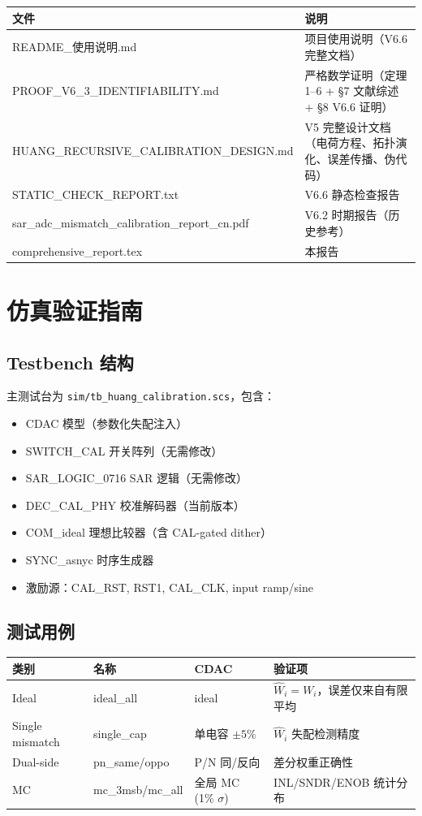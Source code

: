 \documentclass[UTF8,a4paper,12pt]{ctexart}
\theoremstyle{definition}
\begin{document}
\begin{longtable}{p{5cm}p{9cm}}
\toprule
\textbf{文件} & \textbf{说明} \\
\midrule
\endhead
\bottomrule
\endfoot
README\_使用说明.md & 项目使用说明（V6.6 完整文档） \\
PROOF\_V6\_3\_IDENTIFIABILITY.md & 严格数学证明（定理 1--6 + §7 文献综述 + §8 V6.6 证明） \\
HUANG\_RECURSIVE\_CALIBRATION\_DESIGN.md & V5 完整设计文档（电荷方程、拓扑演化、误差传播、伪代码） \\
STATIC\_CHECK\_REPORT.txt & V6.6 静态检查报告 \\
sar\_adc\_mismatch\_calibration\_report\_cn.pdf & V6.2 时期报告（历史参考） \\
comprehensive\_report.tex & 本报告 \\
\bottomrule
\end{longtable}

\section{仿真验证指南}

\subsection{Testbench 结构}

主测试台为 \texttt{sim/tb\_huang\_calibration.scs}，包含：
\begin{itemize}
  \item CDAC 模型（参数化失配注入）
  \item SWITCH\_CAL 开关阵列（无需修改）
  \item SAR\_LOGIC\_0716 SAR 逻辑（无需修改）
  \item DEC\_CAL\_PHY 校准解码器（当前版本）
  \item COM\_ideal 理想比较器（含 CAL-gated dither）
  \item SYNC\_asnyc 时序生成器
  \item 激励源：CAL\_RST, RST1, CAL\_CLK, input ramp/sine
\end{itemize}

\subsection{测试用例}

\begin{longtable}{p{2.5cm}p{4cm}p{3cm}p{4.5cm}}
\toprule
\textbf{类别} & \textbf{名称} & \textbf{CDAC} & \textbf{验证项} \\
\midrule
\endhead
\bottomrule
\endfoot
Ideal & ideal\_all & ideal & $\hat W_i = W_i$，误差仅来自有限平均 \\
Single mismatch & single\_cap & 单电容 $\pm 5\%$ & $\hat W_i$ 失配检测精度 \\
Dual-side & pn\_same/oppo & P/N 同/反向 & 差分权重正确性 \\
MC & mc\_3msb/mc\_all & 全局 MC (1\% $\sigma$) & INL/SNDR/ENOB 统计分布 \\
\bottomrule
\end{longtable}
\end{document}
